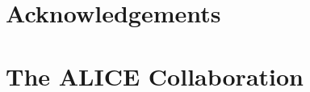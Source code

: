 \documentclass[ALICE,manyauthors]{cernphprep}
\begin{document}

\newenvironment{acknowledgement}{\relax}{\relax}
\begin{acknowledgement}
\section*{Acknowledgements}
%
\end{acknowledgement}



\newpage
\appendix

%
%

\section{The ALICE Collaboration}
\label{app:collab}
%  
\end{document}
